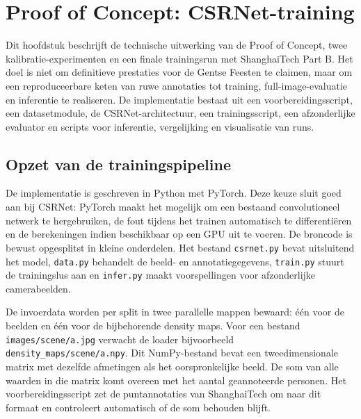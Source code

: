
\chapter{Proof of Concept: CSRNet-training}
\label{ch:poc}

Dit hoofdstuk beschrijft de technische uitwerking van de Proof of Concept, twee kalibratie-experimenten en een finale trainingsrun met ShanghaiTech Part B. Het doel is niet om definitieve prestaties voor de Gentse Feesten te claimen, maar om een reproduceerbare keten van ruwe annotaties tot training, full-image-evaluatie en inferentie te realiseren. De implementatie bestaat uit een voorbereidingsscript, een datasetmodule, de CSRNet-architectuur, een trainingsscript, een afzonderlijke evaluator en scripts voor inferentie, vergelijking en visualisatie van runs.

\section{Opzet van de trainingspipeline}

De implementatie is geschreven in Python met PyTorch. Deze keuze sluit goed aan bij CSRNet: PyTorch maakt het mogelijk om een bestaand convolutioneel netwerk te hergebruiken, de fout tijdens het trainen automatisch te differentiëren en de berekeningen indien beschikbaar op een GPU uit te voeren. De broncode is bewust opgesplitst in kleine onderdelen. Het bestand \texttt{csrnet.py} bevat uitsluitend het model, \texttt{data.py} behandelt de beeld- en annotatiegegevens, \texttt{train.py} stuurt de trainingslus aan en \texttt{infer.py} maakt voorspellingen voor afzonderlijke camerabeelden.

De invoerdata worden per split in twee parallelle mappen bewaard: één voor de beelden en één voor de bijbehorende density maps. Voor een bestand \texttt{images/scene/a.jpg} verwacht de loader bijvoorbeeld \texttt{density\_maps/scene/a.npy}. Dit NumPy-bestand bevat een tweedimensionale matrix met dezelfde afmetingen als het oorspronkelijke beeld. De som van alle waarden in die matrix komt overeen met het aantal geannoteerde personen. Het voorbereidingsscript zet de puntannotaties van ShanghaiTech om naar dit formaat en controleert automatisch of de som behouden blijft.

